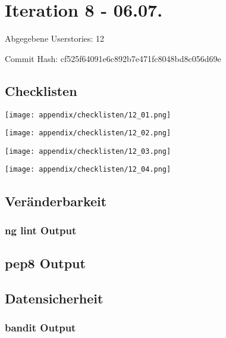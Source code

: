 \section{Iteration 8 - 06.07.}
	Abgegebene Userstories: 12
	
	Commit Hash: cf525f64091e6c892b7e471fc8048bd8c056d69e

	
	\subsection*{Checklisten}
	
		\pagebreak
		
	\texttt{[image: appendix/checklisten/12\_01.png]}\\
	
		\pagebreak
		
	\texttt{[image: appendix/checklisten/12\_02.png]}\\
	
		\pagebreak
		
	\texttt{[image: appendix/checklisten/12\_03.png]}\\
	
		\pagebreak
		
	\texttt{[image: appendix/checklisten/12\_04.png]}\\
	
		\pagebreak

	\subsection*{Veränderbarkeit}
	\subsubsection*{ng lint Output}
	
	\subsection*{pep8 Output}
	

	\subsection*{Datensicherheit}
	\subsubsection*{bandit Output}
	